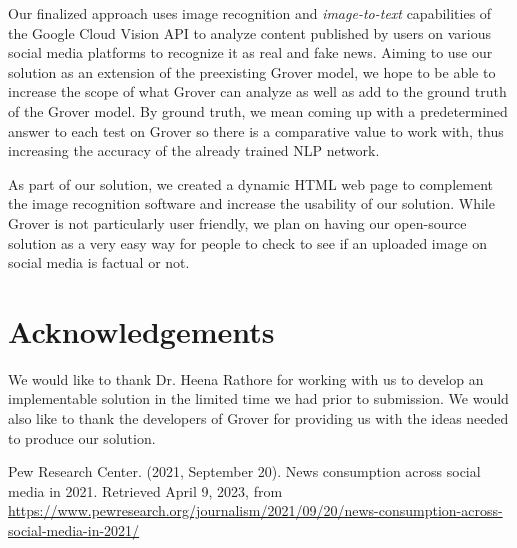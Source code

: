 \documentclass[conference]{IEEEtran}
\begin{document}
Our finalized approach uses image recognition and \emph{image-to-text} capabilities of the Google Cloud Vision API to analyze content published by users on various social media platforms to recognize it as real and fake news. Aiming to use our solution as an extension of the preexisting Grover model, we hope to be able to increase the scope of what Grover can analyze as well as add to the ground truth of the Grover model. By ground truth, we mean coming up with a predetermined answer to each test on Grover so there is a comparative value to work with, thus increasing the accuracy of the already trained NLP network. 

As part of our solution, we created a dynamic HTML web page to complement the image recognition software and increase the usability of our solution. While Grover is not particularly user friendly, we plan on having our open-source solution as a very easy way for people to check to see if an uploaded image on social media is factual or not. 

\section{Acknowledgements}

We would like to thank Dr. Heena Rathore for working with us to develop an implementable solution in the limited time we had prior to submission. We would also like to thank the developers of Grover for providing us with the ideas needed to produce our solution. 

\begin{thebibliography}{00}
 Pew Research Center. (2021, September 20). News consumption across social media in 2021. Retrieved April 9, 2023, from \url{https://www.pewresearch.org/journalism/2021/09/20/news-consumption-across-social-media-in-2021/}
\end{thebibliography}
\vspace{12pt}
\end{document}
